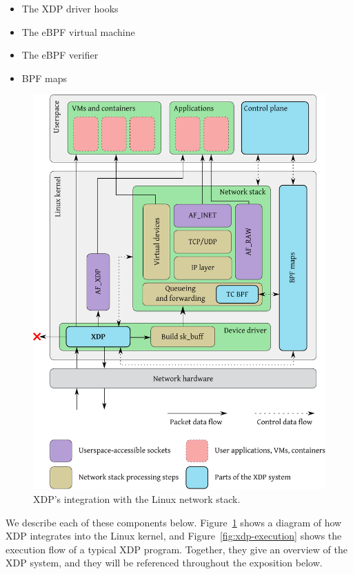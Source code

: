 \documentclass[10pt,sigconf]{acmart}
\begin{document}
\begin{itemize}
\item The XDP driver hooks
\item The eBPF virtual machine
\item The eBPF verifier
\item BPF maps
\end{itemize}

\begin{figure}[t]
\centering
\includegraphics[width=\linewidth]{figures/kernel-diagram.pdf}
\caption{\label{fig:xdp-kernel} XDP's integration with the Linux network stack.}
\end{figure}


We describe each of these components below. Figure~\ref{fig:xdp-kernel} shows a
diagram of how XDP integrates into the Linux kernel, and
Figure~\ref{fig:xdp-execution} shows the execution flow of a typical XDP
program. Together, they give an overview of the XDP system, and they will be
referenced throughout the exposition below.
\end{document}
